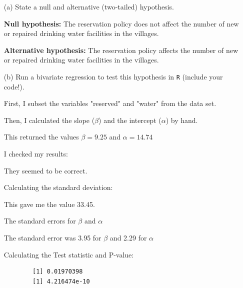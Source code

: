 \documentclass[12pt,letterpaper]{article}
\begin{document}
\newpage
\begin{enumerate}
	\item [(a)] State a null and alternative (two-tailed) hypothesis. 
	
	\textbf{Null hypothesis:} The reservation policy does not affect the number of new or 
	repaired drinking water facilities in the villages. 
	
	\textbf{Alternative hypothesis:} The reservation policy affects the number of new or
	repaired drinking water facilities in the villages.
	
	\item [(b)] Run a bivariate regression to test this hypothesis in \texttt{R} (include your code!).
		
	First, I subset the variables "reserved" and "water" from the data set.			
		  	
		
	Then, I calculated the slope ($\beta$) and the intercept ($\alpha$) by hand.
	
		  	
		
	This returned the values $\beta = 9.25$ and $\alpha = 14.74$
	
	I checked my results: 
	
		  	
		
	They seemed to be correct.
	
	Calculating the standard deviation: 
	
		  	
	This gave me the value 33.45.
		
	The standard errors for $\beta$ and $\alpha$
	
		  	
		  	
	
	The standard error was 3.95 for $\beta$ and 2.29 for $\alpha$
	
	\newpage
	
	Calculating the Test statistic and P-value:
	
		  	
	
	\begin{verbatim}
		[1] 0.01970398
		[1] 4.216474e-10
	\end{verbatim}
	

\end{enumerate}
\end{document}
